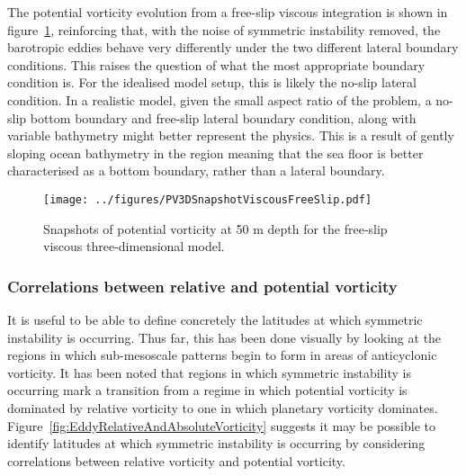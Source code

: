 The potential vorticity evolution from a free-slip viscous integration is shown in figure~\ref{fig:PV3DSnapshotViscousFreeSlip}, reinforcing that, with the noise of symmetric instability removed, the barotropic eddies behave very differently under the two different lateral boundary conditions. This raises the question of what the most appropriate boundary condition is. For the idealised model setup, this is likely the no-slip lateral condition. In a realistic model, given the small aspect ratio of the problem, a no-slip bottom boundary and free-slip lateral boundary condition, along with variable bathymetry might better represent the physics. This is a result of gently sloping ocean bathymetry in the region meaning that the sea floor is better characterised as a bottom boundary, rather than a lateral boundary.

\begin{figure} 
    \centering
    \texttt{[image: ../figures/PV3DSnapshotViscousFreeSlip.pdf]}
    \caption{Snapshots of potential vorticity at 50 m depth for the free-slip viscous three-dimensional model.}
    \label{fig:PV3DSnapshotViscousFreeSlip}
\end{figure}

\subsubsection{Correlations between relative and potential vorticity}
It is useful to be able to define concretely the latitudes at which symmetric instability is occurring. Thus far, this has been done visually by looking at the regions in which sub-mesoscale patterns begin to form in areas of anticyclonic vorticity. It has been noted that regions in which symmetric instability is occurring mark a transition from a regime in which potential vorticity is dominated by relative vorticity to one in which planetary vorticity dominates. Figure~\ref{fig:EddyRelativeAndAbsoluteVorticity} suggests it may be possible to identify latitudes at which symmetric instability is occurring by considering correlations between relative vorticity and potential vorticity.

